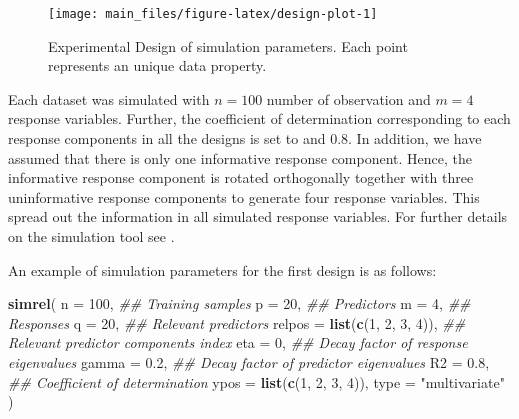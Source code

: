 \documentclass[12pt,3p,authoryear]{elsarticle}
\newenvironment{Shaded}{\begin{snugshade}}{\end{snugshade}}
\newcommand{\CommentTok}[1]{\textcolor[rgb]{0.56,0.35,0.01}{\textit{#1}}}
\newcommand{\DataTypeTok}[1]{\textcolor[rgb]{0.13,0.29,0.53}{#1}}
\newcommand{\DecValTok}[1]{\textcolor[rgb]{0.00,0.00,0.81}{#1}}
\newcommand{\FloatTok}[1]{\textcolor[rgb]{0.00,0.00,0.81}{#1}}
\newcommand{\KeywordTok}[1]{\textcolor[rgb]{0.13,0.29,0.53}{\textbf{#1}}}
\newcommand{\NormalTok}[1]{#1}
\newcommand{\StringTok}[1]{\textcolor[rgb]{0.31,0.60,0.02}{#1}}
\providecommand{\tightlist}{%
  \setlength{\itemsep}{0pt}\setlength{\parskip}{0pt}}
\begin{document}
\begin{figure}
\texttt{[image: main\_files/figure-latex/design-plot-1]} \caption{Experimental Design of simulation parameters. Each point represents an unique data property.}\label{fig:design-plot}
\end{figure}

\begin{description}
\tightlist
\item[\textbf{Common parameters:}]
Each dataset was simulated with \(n = 100\) number of observation and
\(m = 4\) response variables. Further, the coefficient of determination
corresponding to each response components in all the designs is set to
and 0.8. In addition, we have assumed that there is only one informative
response component. Hence, the informative response component is rotated
orthogonally together with three uninformative response components to
generate four response variables. This spread out the information in all
simulated response variables. For further details on the simulation tool
see \citep{Rimal2018}.
\end{description}

An example of simulation parameters for the first design is as follows:

\begin{Shaded}
\begin{Highlighting}[]
\KeywordTok{simrel}\NormalTok{(}
    \DataTypeTok{n       =} \DecValTok{100}\NormalTok{,                 }\CommentTok{## Training samples}
    \DataTypeTok{p       =} \DecValTok{20}\NormalTok{,                  }\CommentTok{## Predictors}
    \DataTypeTok{m       =} \DecValTok{4}\NormalTok{,                   }\CommentTok{## Responses}
    \DataTypeTok{q       =} \DecValTok{20}\NormalTok{,                  }\CommentTok{## Relevant predictors}
    \DataTypeTok{relpos  =} \KeywordTok{list}\NormalTok{(}\KeywordTok{c}\NormalTok{(}\DecValTok{1}\NormalTok{, }\DecValTok{2}\NormalTok{, }\DecValTok{3}\NormalTok{, }\DecValTok{4}\NormalTok{)), }\CommentTok{## Relevant predictor components index}
    \DataTypeTok{eta     =} \DecValTok{0}\NormalTok{,                   }\CommentTok{## Decay factor of response eigenvalues}
    \DataTypeTok{gamma   =} \FloatTok{0.2}\NormalTok{,                 }\CommentTok{## Decay factor of predictor eigenvalues}
    \DataTypeTok{R2      =} \FloatTok{0.8}\NormalTok{,                 }\CommentTok{## Coefficient of determination}
    \DataTypeTok{ypos    =} \KeywordTok{list}\NormalTok{(}\KeywordTok{c}\NormalTok{(}\DecValTok{1}\NormalTok{, }\DecValTok{2}\NormalTok{, }\DecValTok{3}\NormalTok{, }\DecValTok{4}\NormalTok{)),}
    \DataTypeTok{type    =} \StringTok{"multivariate"}
\NormalTok{)}
\end{Highlighting}
\end{Shaded}
\end{document}
